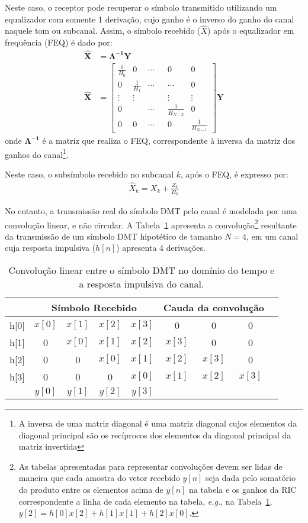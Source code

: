 Neste caso, o receptor pode recuperar o símbolo transmitido utilizando um equalizador com somente 1 derivação, cujo ganho é o inverso do ganho do canal naquele tom ou subcanal. Assim, o símbolo recebido ($\hat{X}$) após o equalizador em frequência (FEQ) é dado por:
\begin{align}
\mathbf{\hat{X}} &= \mathbf{\Lambda^{-1}} \mathbf{Y}\nonumber\\
\mathbf{\hat{X}} &= \left[
\begin{array}{cccccc}
\frac{1}{H_0} & 0 & \cdots & & 0 & 0\\
0 & \frac{1}{H_1} & \cdots &  &\cdots & 0\\
\vdots & \vdots & & & \vdots & \vdots\\
0& & \cdots & & \frac{1}{H_{N-2}}& 0\\
0 & 0 & \cdots & & 0 & \frac{1}{H_{N-1}}
\end{array}
\right] \mathbf{Y}
\end{align}
onde $\mathbf{\Lambda^{-1}}$ é a matriz que realiza o FEQ, correspondente à inversa da matriz dos ganhos do canal\footnote{A inversa de uma matriz diagonal é uma matriz diagonal cujos elementos da diagonal principal são os recíprocos dos elementos da diagonal principal da matriz invertida}.  

Neste caso, o subsímbolo recebido no subcanal $k$, após o FEQ, é expresso por:
\begin{align}
\hat{X}_k = X_k + \frac{Z_k}{H_k}
\end{align}

No entanto, a transmissão real do símbolo DMT pelo canal é modelada por uma convolução linear, e não circular. A Tabela~\ref{tab:convolution} apresenta a convolução\footnote{ As tabelas apresentadas para representar convoluções devem ser lidas de maneira que cada amostra do vetor recebido $y[n]$ seja dada pelo somatório do produto entre os elementos acima de $y[n]$ na tabela e os ganhos da RIC correspondente a linha de cada elemento na tabela, \textsl{e.g.}, na Tabela~\ref{tab:convolution}, $ y[2] = h[0]x[2] + h[1]x[1] + h[2]x[0] $.} resultante da transmissão de um símbolo DMT hipotético de tamanho $N=4$, em um canal cuja resposta impulsiva ($h[n]$) apresenta 4 derivações.

\begin{table}[htbp]
\centering
\begin{tabular}{c | c c c c |c c c c}
\hline
& \multicolumn{4}{|c|}{Símbolo Recebido} & \multicolumn{3}{|c|}{Cauda da convolução} \\
\hline
h[0] & $x[0]$ & $x[1]$ & $x[2]$ &  $x[3]$ & 0 & 0 & 0 \\
h[1] & 0 & $x[0]$ & $x[1]$ & $x[2]$ &  $x[3]$ & 0 & 0 \\
h[2] & 0 & 0 & $x[0]$ & $x[1]$ & $x[2]$ &  $x[3]$ & 0\\
h[3] & 0 & 0 & 0 & $x[0]$ & $x[1]$ & $x[2]$ &  $x[3]$\\
\hline
 & $y[0]$ & $y[1]$ & $y[2]$ & $y[3]$
\end{tabular}
\caption{Convolução linear entre o símbolo DMT no domínio do tempo e a resposta impulsiva do canal. \label{tab:convolution}}
\end{table}

